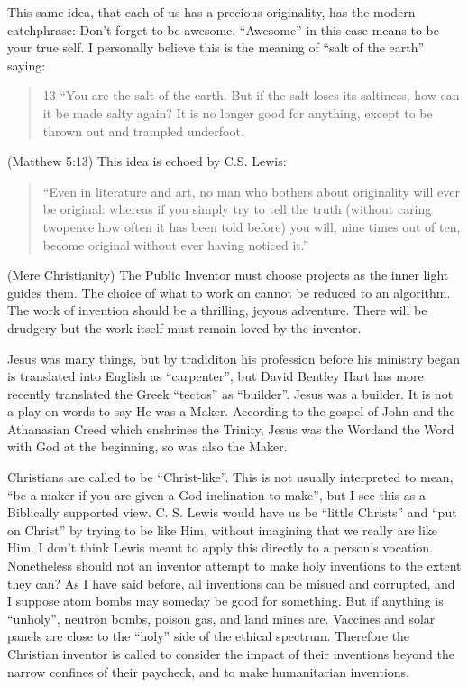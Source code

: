 \documentclass[
	fontsize=10pt, %
	twoside=false, %
	secnumdepth=1, %
]{kaobook}
\begin{document}
This same idea, that each of us has a precious originality,
has the modern catchphrase: Don't forget to be awesome.
``Awesome'' in this case means to be your true self.
I personally believe this is the meaning of ``salt of the earth'' saying:
\blockquote{
  13 “You are the salt of the earth. But if the salt loses its saltiness, how can it be made salty again? It is no longer good for anything, except to be thrown out and trampled underfoot.
}(Matthew 5:13)
This idea is echoed by C.S. Lewis:
\blockquote{
  “Even in literature and art, no man who bothers about originality will ever be original: whereas if you simply try to tell the truth (without caring twopence how often it has been told before) you will, nine times out of ten, become original without ever having noticed it.”
}(Mere Christianity)
The Public Inventor must choose projects as the inner light guides them.
The choice of what to work on cannot be reduced to an algorithm.
The work of invention should be a thrilling, joyous adventure.
There will be drudgery but the work itself must remain loved
by the inventor.

Jesus was many things, but by tradiditon his profession
before his ministry began is translated into English as ``carpenter'', but
David Bentley Hart has more recently translated the Greek ``tectos'' as
``builder''\cite{hart2017new}. Jesus was a builder. It is not a play on words to say
He was a Maker.
According to the gospel of John and the Athanasian Creed which enshrines
the Trinity, Jesus was the Wordand the Word with God at the beginning,
so was also the Maker.

Christians are called to be ``Christ-like''. This is not usually interpreted to mean,
``be a maker if you are given a God-inclination to make'', but I see this as
a Biblically supported view.
C. S. Lewis would have us be ``little Christs'' and ``put on Christ''
by trying to be like Him, without imagining that we really are like Him.
I don't think Lewis meant to apply this directly to a person's vocation.
Nonetheless should not an inventor attempt to make holy inventions to the
extent they can?
As I have said before, all inventions can be misued and corrupted, and
I suppose atom bombs may someday be good for something.
But if anything is ``unholy'', neutron bombs,
poison gas, and land mines are.
Vaccines and solar panels are close to the ``holy'' side of the ethical spectrum.
Therefore the Christian inventor is called to consider the impact of
their inventions beyond the narrow confines of their paycheck,
and to make humanitarian inventions.
\end{document}
